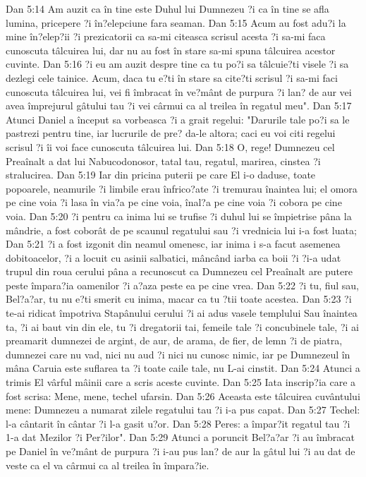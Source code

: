 Dan 5:14  Am auzit ca în tine este Duhul lui Dumnezeu ?i ca în tine se afla lumina, pricepere ?i în?elepciune fara seaman.
Dan 5:15  Acum au fost adu?i la mine în?elep?ii ?i prezicatorii ca sa-mi citeasca scrisul acesta ?i sa-mi faca cunoscuta tâlcuirea lui, dar nu au fost în stare sa-mi spuna tâlcuirea acestor cuvinte.
Dan 5:16  ?i eu am auzit despre tine ca tu po?i sa tâlcuie?ti visele ?i sa dezlegi cele tainice. Acum, daca tu e?ti în stare sa cite?ti scrisul ?i sa-mi faci cunoscuta tâlcuirea lui, vei fi îmbracat în ve?mânt de purpura ?i lan? de aur vei avea împrejurul gâtului tau ?i vei cârmui ca al treilea în regatul meu".
Dan 5:17  Atunci Daniel a început sa vorbeasca ?i a grait regelui: "Darurile tale po?i sa le pastrezi pentru tine, iar lucrurile de pre? da-le altora; caci eu voi citi regelui scrisul ?i îi voi face cunoscuta tâlcuirea lui.
Dan 5:18  O, rege! Dumnezeu cel Preaînalt a dat lui Nabucodonosor, tatal tau, regatul, marirea, cinstea ?i stralucirea.
Dan 5:19  Iar din pricina puterii pe care El i-o daduse, toate popoarele, neamurile ?i limbile erau înfrico?ate ?i tremurau înaintea lui; el omora pe cine voia ?i lasa în via?a pe cine voia, înal?a pe cine voia ?i cobora pe cine voia.
Dan 5:20  ?i pentru ca inima lui se trufise ?i duhul lui se împietrise pâna la mândrie, a fost coborât de pe scaunul regatului sau ?i vrednicia lui i-a fost luata;
Dan 5:21  ?i a fost izgonit din neamul omenesc, iar inima i s-a facut asemenea dobitoacelor, ?i a locuit cu asinii salbatici, mâncând iarba ca boii ?i ?i-a udat trupul din roua cerului pâna a recunoscut ca Dumnezeu cel Preaînalt are putere peste împara?ia oamenilor ?i a?aza peste ea pe cine vrea.
Dan 5:22  ?i tu, fiul sau, Bel?a?ar, tu nu e?ti smerit cu inima, macar ca tu ?tii toate acestea.
Dan 5:23  ?i te-ai ridicat împotriva Stapânului cerului ?i ai adus vasele templului Sau înaintea ta, ?i ai baut vin din ele, tu ?i dregatorii tai, femeile tale ?i concubinele tale, ?i ai preamarit dumnezei de argint, de aur, de arama, de fier, de lemn ?i de piatra, dumnezei care nu vad, nici nu aud ?i nici nu cunosc nimic, iar pe Dumnezeul în mâna Caruia este suflarea ta ?i toate caile tale, nu L-ai cinstit.
Dan 5:24  Atunci a trimis El vârful mâinii care a scris aceste cuvinte.
Dan 5:25  Iata inscrip?ia care a fost scrisa: Mene, mene, techel ufarsin.
Dan 5:26  Aceasta este tâlcuirea cuvântului mene: Dumnezeu a numarat zilele regatului tau ?i i-a pus capat.
Dan 5:27  Techel: l-a cântarit în cântar ?i l-a gasit u?or.
Dan 5:28  Peres: a împar?it regatul tau ?i 1-a dat Mezilor ?i Per?ilor".
Dan 5:29  Atunci a poruncit Bel?a?ar ?i au îmbracat pe Daniel în ve?mânt de purpura ?i i-au pus lan? de aur la gâtul lui ?i au dat de veste ca el va cârmui ca al treilea în împara?ie.
